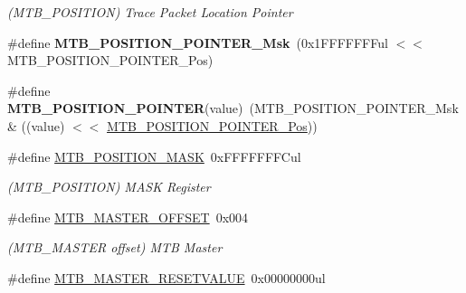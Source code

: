 \begin{DoxyCompactItemize}
\begin{DoxyCompactList}\small\item\em (M\+T\+B\+\_\+\+P\+O\+S\+I\+T\+I\+O\+N) Trace Packet Location Pointer \end{DoxyCompactList}\item 
\hypertarget{group___s_a_m_l21___m_t_b_ga013976edca9647c438955dd2fbf24ec2}{}\#define {\bfseries M\+T\+B\+\_\+\+P\+O\+S\+I\+T\+I\+O\+N\+\_\+\+P\+O\+I\+N\+T\+E\+R\+\_\+\+Msk}~(0x1\+F\+F\+F\+F\+F\+F\+Ful $<$$<$ M\+T\+B\+\_\+\+P\+O\+S\+I\+T\+I\+O\+N\+\_\+\+P\+O\+I\+N\+T\+E\+R\+\_\+\+Pos)\label{group___s_a_m_l21___m_t_b_ga013976edca9647c438955dd2fbf24ec2}

\item 
\hypertarget{group___s_a_m_l21___m_t_b_gac83f3ecf8be77e14dace064def6cc5a4}{}\#define {\bfseries M\+T\+B\+\_\+\+P\+O\+S\+I\+T\+I\+O\+N\+\_\+\+P\+O\+I\+N\+T\+E\+R}(value)~(M\+T\+B\+\_\+\+P\+O\+S\+I\+T\+I\+O\+N\+\_\+\+P\+O\+I\+N\+T\+E\+R\+\_\+\+Msk \& ((value) $<$$<$ \hyperlink{group___s_a_m_l21___m_t_b_gaa28512e5fb745a251e5d1d36942f62ea}{M\+T\+B\+\_\+\+P\+O\+S\+I\+T\+I\+O\+N\+\_\+\+P\+O\+I\+N\+T\+E\+R\+\_\+\+Pos}))\label{group___s_a_m_l21___m_t_b_gac83f3ecf8be77e14dace064def6cc5a4}

\item 
\hypertarget{group___s_a_m_l21___m_t_b_ga8b3e0774e0074b7912373bb10ff53d2c}{}\#define \hyperlink{group___s_a_m_l21___m_t_b_ga8b3e0774e0074b7912373bb10ff53d2c}{M\+T\+B\+\_\+\+P\+O\+S\+I\+T\+I\+O\+N\+\_\+\+M\+A\+S\+K}~0x\+F\+F\+F\+F\+F\+F\+F\+Cul\label{group___s_a_m_l21___m_t_b_ga8b3e0774e0074b7912373bb10ff53d2c}

\begin{DoxyCompactList}\small\item\em (M\+T\+B\+\_\+\+P\+O\+S\+I\+T\+I\+O\+N) M\+A\+S\+K Register \end{DoxyCompactList}\item 
\hypertarget{group___s_a_m_l21___m_t_b_gac842229fe0e49e4bbcc3513eceef11f4}{}\#define \hyperlink{group___s_a_m_l21___m_t_b_gac842229fe0e49e4bbcc3513eceef11f4}{M\+T\+B\+\_\+\+M\+A\+S\+T\+E\+R\+\_\+\+O\+F\+F\+S\+E\+T}~0x004\label{group___s_a_m_l21___m_t_b_gac842229fe0e49e4bbcc3513eceef11f4}

\begin{DoxyCompactList}\small\item\em (M\+T\+B\+\_\+\+M\+A\+S\+T\+E\+R offset) M\+T\+B Master \end{DoxyCompactList}\item 
\hypertarget{group___s_a_m_l21___m_t_b_ga2a89518994d6e0ab1cfd84e5ced03e50}{}\#define \hyperlink{group___s_a_m_l21___m_t_b_ga2a89518994d6e0ab1cfd84e5ced03e50}{M\+T\+B\+\_\+\+M\+A\+S\+T\+E\+R\+\_\+\+R\+E\+S\+E\+T\+V\+A\+L\+U\+E}~0x00000000ul\label{group___s_a_m_l21___m_t_b_ga2a89518994d6e0ab1cfd84e5ced03e50}


\end{DoxyCompactItemize}
